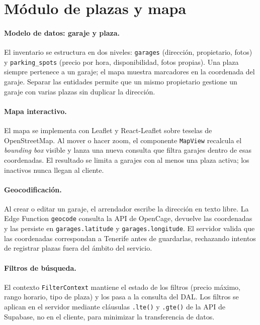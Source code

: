 \section{Módulo de plazas y mapa}
\label{sec:impl_parking}

\paragraph{Modelo de datos: garaje y plaza.}
El inventario se estructura en dos niveles: \texttt{garages} (dirección, propietario, fotos) y \texttt{parking\_spots} (precio por hora, disponibilidad, fotos propias). Una plaza siempre pertenece a un garaje; el mapa muestra marcadores en la coordenada del garaje. Separar las entidades permite que un mismo propietario gestione un garaje con varias plazas sin duplicar la dirección.

\paragraph{Mapa interactivo.}
El mapa se implementa con Leaflet y React-Leaflet sobre teselas de OpenStreetMap. Al mover o hacer zoom, el componente \texttt{MapView} recalcula el \textit{bounding box} visible y lanza una nueva consulta que filtra garajes dentro de esas coordenadas. El resultado se limita a garajes con al menos una plaza activa; los inactivos nunca llegan al cliente.

\paragraph{Geocodificación.}
Al crear o editar un garaje, el arrendador escribe la dirección en texto libre. La Edge Function \texttt{geocode} consulta la API de OpenCage, devuelve las coordenadas y las persiste en \texttt{garages.latitude} y \texttt{garages.longitude}. El servidor valida que las coordenadas correspondan a Tenerife antes de guardarlas, rechazando intentos de registrar plazas fuera del ámbito del servicio.

\paragraph{Filtros de búsqueda.}
El contexto \texttt{FilterContext} mantiene el estado de los filtros (precio máximo, rango horario, tipo de plaza) y los pasa a la consulta del DAL. Los filtros se aplican en el servidor mediante cláusulas \texttt{.lte()} y \texttt{.gte()} de la API de Supabase, no en el cliente, para minimizar la transferencia de datos.

